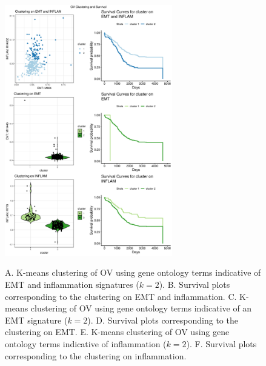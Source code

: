 \documentclass[11pt]{article}
\begin{document}
\begin{figure}
\center
{\includegraphics[width=0.65\textwidth]{Figure6/OV.pdf}}
\caption{A. K-means clustering of OV using gene ontology terms indicative of EMT and inflammation signatures ($k=2$).
B. Survival plots corresponding to the clustering on EMT and inflammation.
C. K-means clustering of OV using gene ontology terms indicative of an EMT signature ($k=2$).
D. Survival plots corresponding to the clustering on EMT.
E. K-means clustering of OV using gene ontology terms indicative of inflammation ($k=2$).
F. Survival plots corresponding to the clustering on inflammation.}
\label{fig:OV}
\end{figure}
\end{document}

